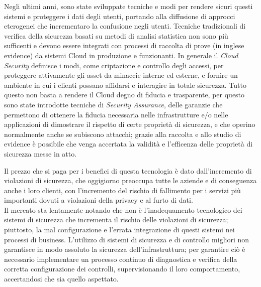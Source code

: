 Negli ultimi anni, sono state sviluppate tecniche e modi per rendere sicuri questi sistemi e proteggere i dati degli utenti, portando 
alla diffusione di approcci eterogenei che incrementaro la confusione negli utenti.
Tecniche tradizionali di verifica della sicurezza basati su metodi di analisi statistica non sono più sufficenti e devono essere integrati 
con processi di raccolta di prove (in inglese evidence) da sistemi Cloud in produzione e funzionanti. 
In generale il \textit{Cloud Security} definisce i modi, come criptazione e controllo degli accessi, per proteggere attivamente gli asset 
da minaccie interne ed esterne, e fornire un ambiente in cui i clienti possano affidarsi e interagire in totale sicurezza. 
Tutto questo non basta a rendere il Cloud degno di fiducia e trasparente, per questo sono state introdotte tecniche di
\textit{Security Assurance}, delle garanzie che permettono di ottenere la fiducia necessaria nelle infrastrutture e/o nelle 
applicazioni di dimostrare il rispetto di certe proprietà di sicurezza, e che operino normalmente anche se subiscono attacchi; grazie 
alla raccolta e allo studio di evidence è possibile che venga accertata la validità e l'efficenza delle proprietà di sicurezza messe in 
atto.

Il prezzo che si paga per i benefici di questa tecnologia è dato dall'incremento di violazioni di sicurezza, che oggigiorno 
preoccupa tutte le aziende e di conseguenza anche i loro clienti, con l'incremento del rischio di fallimento per i servizi più importanti 
dovuti a violazioni della privacy e al furto di dati. 
\\
Il mercato sta lentamente notando che non è l'inadequamento tecnologico dei sistemi di sicurezza che incrementa il rischio delle 
violazioni di sicurezza; piuttosto, la mal configurazione e l'errata integrazione di questi sistemi nei processi di business. 
\cite{cloud-Platform-for-ICT-Security-Governance}
L'utilizzo di sistemi di sicurezza e di controllo migliori non garantisce in modo assoluto la sicurezza dell'infrastruttura; 
per garantire ciò è necessario implementare un processo continuo di diagnostica e verifica della corretta configurazione dei controlli, 
supervisionando il loro comportamento, accertandosi che sia quello aspettato.

